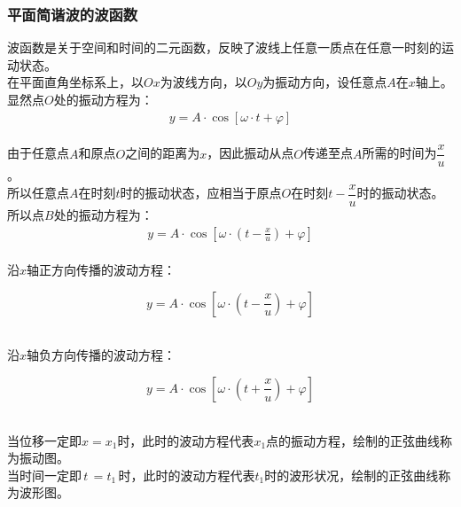 \documentclass[UTF8]{ctexart}
\begin{document}
\newpage

\subsubsection{平面简谐波的波函数}
    波函数是关于空间和时间的二元函数，反映了波线上任意一质点在任意一时刻的运动状态。\\[3mm]
    在平面直角坐标系上，以$Ox$为波线方向，以$Oy$为振动方向，设任意点$A$在$x$轴上。\\[3mm]
    显然点$O$处的振动方程为：
    \setcounter{equation}{0}
    \begin{align}
        y=A\cdot\cos{\left[\omega\cdot t+\varphi\right]}
    \end{align}\\
    由于任意点$A$和原点$O$之间的距离为$x$，因此振动从点$O$传递至点$A$所需的时间为$\dfrac{x}{u}$。\\[3mm]
    所以任意点$A$在时刻$t$时的振动状态，应相当于原点$O$在时刻$t-\dfrac{x}{u}$时的振动状态。\\[5mm]
    所以点$B$处的振动方程为：
    \begin{align}
        y=A\cdot\cos{\left[\omega\cdot\left(t-\frac{x}{u}\right)+\varphi\right]}
    \end{align}\\
    沿$x$轴正方向传播的波动方程：
    \begin{large}
        \begin{equation*}
            y=A\cdot\cos{\left[\omega\cdot\left(t-\frac{x}{u}\right)+\varphi\right]}
        \end{equation*}
    \end{large}\\
    沿$x$轴负方向传播的波动方程：
    \begin{large}
        \begin{equation*}
            y=A\cdot\cos{\left[\omega\cdot\left(t+\frac{x}{u}\right)+\varphi\right]}
        \end{equation*}
    \end{large}\\
    当位移一定即$x=x_1$时，此时的波动方程代表$x_1$点的振动方程，绘制的正弦曲线称为振动图。\\[3mm]
    当时间一定即$\,t\,=t_1\,$时，此时的波动方程代表$t_1$时的波形状况，绘制的正弦曲线称为波形图。\\[3mm]

\newpage
\end{document}
